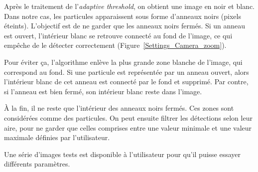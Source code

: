 Après le traitement de l'\textit{adaptive threshold}, on obtient une image en noir et blanc. Dans notre cas, les particules apparaissent sous forme d'anneaux noirs (pixels éteints). L'objectif est de ne garder que les anneaux noirs fermés. Si un anneau est ouvert, l'intérieur blanc se retrouve connecté au fond de l'image, ce qui empêche de le détecter correctement (Figure~\ref{Settings_Camera_zoom}).

Pour éviter ça, l'algorithme enlève la plus grande zone blanche de l'image, qui correspond au fond. Si une particule est représentée par un anneau ouvert, alors l'intérieur blanc de cet anneau est connecté par le fond et supprimé. Par contre, si l'anneau est bien fermé, son intérieur blanc reste dans l'image.

À la fin, il ne reste que l'intérieur des anneaux noirs fermés. Ces zones sont considérées comme des particules. On peut ensuite filtrer les détections selon leur aire, pour ne garder que celles comprises entre une valeur minimale et une valeur maximale définies par l'utilisateur.





Une série d'images tests est disponible à l'utilisateur pour qu'il puisse essayer différents paramètres.

